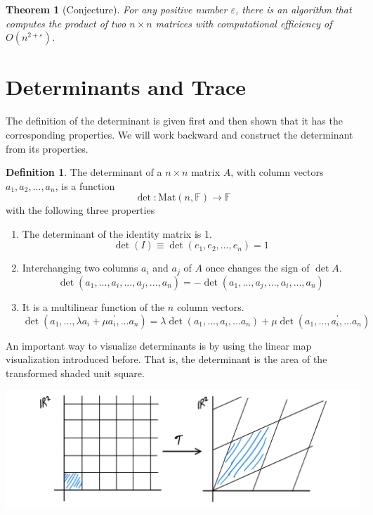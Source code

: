 \documentclass{article}
\newtheorem{theorem}{Theorem}[section]
\theoremstyle{remark}
\theoremstyle{definition}
\newtheorem{definition}{Definition}[section]
\begin{document}
\begin{theorem}[Conjecture]
For any positive number $\varepsilon$, there is an algorithm that computes the product of two $n \times n$ matrices with computational efficiency of $O(n^{2 + \varepsilon})$. 
\end{theorem}

\section{Determinants and Trace}
The definition of the determinant is given first and then shown that it has the corresponding properties. We will work backward and construct the determinant from its properties. 

\begin{definition}
The determinant of a $n \times n$ matrix $A$, with column vectors $a_1, a_2, ..., a_n$, is a function
\[\det: \text{Mat}(n, \mathbb{F}) \longrightarrow \mathbb{F}\]
with the following three properties
\begin{enumerate}
    \item The determinant of the identity matrix is 1. 
\[\det{(I)} \equiv \det{(e_1, e_2, ..., e_n)} = 1\]
    \item Interchanging two columns $a_i$ and $a_j$ of $A$ once changes the sign of $\det{A}$. 
\[\det{(a_1, ..., a_i, ..., a_j, ..., a_n)} = -\det{(a_1, ..., a_j, ..., a_i, ..., a_n)}\]
    \item It is a multilinear function of the $n$ column vectors. 
\[\det{(a_1, ..., \lambda a_i + \mu a_i^\prime, ... a_n)} = \lambda \det{(a_1, ..., a_i, ... a_n)} + \mu \det{(a_1, ..., a_i^\prime, ... a_n)} \]
\end{enumerate}
\end{definition}

An important way to visualize determinants is by using the linear map visualization introduced before. That is, the determinant is the area of the transformed shaded unit square. 
\begin{center}
    \includegraphics[scale=0.25]{Images/Determinant.PNG}
\end{center}
\end{document}
